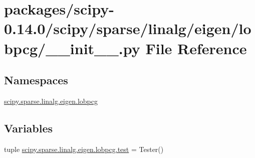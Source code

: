 \hypertarget{packages_2scipy-0_814_80_2scipy_2sparse_2linalg_2eigen_2lobpcg_2____init_____8py}{}\section{packages/scipy-\/0.14.0/scipy/sparse/linalg/eigen/lobpcg/\+\_\+\+\_\+init\+\_\+\+\_\+.py File Reference}
\label{packages_2scipy-0_814_80_2scipy_2sparse_2linalg_2eigen_2lobpcg_2____init_____8py}
\subsection*{Namespaces}
\begin{DoxyCompactItemize}
\item 
 \hyperlink{namespacescipy_1_1sparse_1_1linalg_1_1eigen_1_1lobpcg}{scipy.\+sparse.\+linalg.\+eigen.\+lobpcg}
\end{DoxyCompactItemize}
\subsection*{Variables}
\begin{DoxyCompactItemize}
\item 
tuple \hyperlink{namespacescipy_1_1sparse_1_1linalg_1_1eigen_1_1lobpcg_aed10e2e58b3041c33747b93d50fee16d}{scipy.\+sparse.\+linalg.\+eigen.\+lobpcg.\+test} = Tester()
\end{DoxyCompactItemize}
